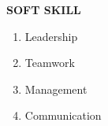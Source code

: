 \documentclass{article}
\begin{document}
   	\begin{flushleft} 
   		
   		\vspace{0.3in}
   		\textbf{SOFT SKILL}
   		\begin{enumerate}
   			\vspace{-0.30in}
   			\addtolength{\itemindent}{1.559in}
   			\item Leadership 
   			\item Teamwork
   			\item Management 
   			\item Communication
   		\end{enumerate}
   	\end{flushleft}
 
\end{document}
